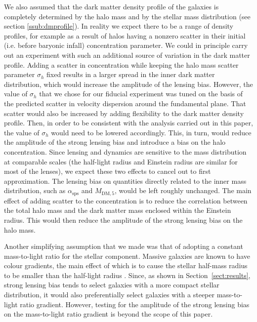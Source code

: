 \documentclass{aa}
\def\asps{\alpha_{\mathrm{sps}}}
\def\mdmfive{M_{\mathrm{DM}, 5}}
\def\Sref#1{Section~\ref{#1}\xspace}
\begin{document}
We also assumed that the dark matter density profile of the galaxies is completely determined by the halo mass and by the stellar mass distribution (see section \ref{ssub:dmprofile}). In reality we expect there to be a range of density profiles, for example as a result of halos having a nonzero scatter in their initial (i.e. before baryonic infall) concentration parameter.
We could in principle carry out an experiment with such an additional source of variation in the dark matter profile.
Adding a scatter in concentration while keeping the halo mass scatter parameter $\sigma_h$ fixed results in a larger spread in the inner dark matter distribution, which would increase the amplitude of the lensing bias. However, the value of $\sigma_h$ that we chose for our fiducial experiment was tuned on the basis of the predicted scatter in velocity dispersion around the fundamental plane. That scatter would also be increased by adding flexibility to the dark matter density profile. Then, in order to be consistent with the analysis carried out in this paper, the value of $\sigma_h$ would need to be lowered accordingly. This, in turn, would reduce the amplitude of the strong lensing bias and introduce a bias on the halo concentration.
Since lensing and dynamics are sensitive to the mass distribution at comparable scales (the half-light radius and Einstein radius are similar for most of the lenses), we expect these two effects to cancel out to first approximation. The lensing bias on quantities directly related to the inner mass distribution, such as $\asps$ and $\mdmfive$, would be left roughly unchanged. 
The main effect of adding scatter to the concentration is to reduce the correlation between the total halo mass and the dark matter mass enclosed within the Einstein radius. This would then reduce the amplitude of the strong lensing bias on the halo mass.

Another simplifying assumption that we made was that of adopting a constant mass-to-light ratio for the stellar component. Massive galaxies are known to have colour gradients, the main effect of which is to cause the stellar half-mass radius to be smaller than the half-light radius \citep{Szo++13,Sue++19}. Since, as shown in \Sref{sect:results}, strong lensing bias tends to select galaxies with a more compact stellar distribution, it would also preferentially select galaxies with a steeper mass-to-light ratio gradient.
However, testing for the amplitude of the strong lensing bias on the mass-to-light ratio gradient is beyond the scope of this paper.
\end{document}
